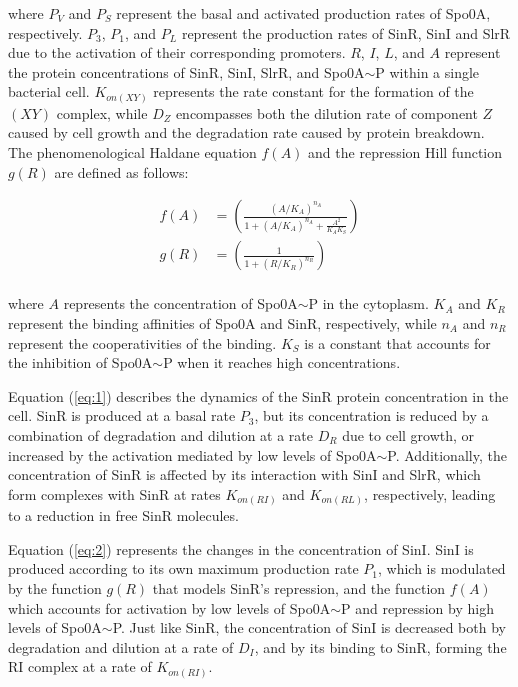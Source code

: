 where  \(P_V\) and \(P_S\) represent the basal and activated production rates of Spo0A, respectively.
\(P_3\), \(P_1\), and \(P_L\) represent the 
 production rates of SinR, SinI and SlrR due to the activation of their corresponding promoters.
 \(R\), \(I\), \(L\), and \(A\) represent the protein concentrations of SinR, SinI, SlrR, and Spo0A$\sim$P within a single
  bacterial cell. \(K_{on(XY)}\) represents the rate constant for the formation of the $(XY)$ complex,
   while \(D_Z\) encompasses both the dilution rate of component $Z$ caused by cell
    growth and the degradation rate caused by protein breakdown. The phenomenological 
    Haldane equation \(f(A)\) and the repression Hill function \(g(R)\) are defined as follows:


\begin{align*}
    f(A) &= \left(\frac{(A/K_A)^{n_A}}{1 + (A/K_A)^{n_A}+ \frac{A^2}{K_A K_S }} \right) \\ 
    g(R) &= \left(\frac{1}{1 + (R/K_R)^{n_R}}\right) \\
\end{align*}  

where $A$ represents the concentration of Spo0A$\sim$P in the cytoplasm. \(K_{A}\) and \(K_R\) represent
 the binding affinities of Spo0A and SinR, respectively, while \(n_A\) and \(n_R\) represent 
 the cooperativities of the binding. \(K_S\) is a constant that accounts for the inhibition of Spo0A$\sim$P 
 when it reaches high concentrations.

Equation (\ref{eq:1}) describes the dynamics of the SinR protein concentration in the cell. SinR is 
produced at a basal rate $P_3$, but its concentration is reduced by a combination of degradation and dilution 
at a rate $D_R$ due to cell growth, or 
increased by the activation mediated by low levels of Spo0A$\sim$P.
Additionally, the concentration of SinR is affected by its interaction with SinI and SlrR, which form complexes with SinR at rates $K_{on(RI)}$ and $K_{on(RL)}$, respectively, leading to a reduction in free SinR molecules.

Equation (\ref{eq:2}) represents the changes in the concentration of SinI. SinI is produced according to its own maximum production rate $P_1$, which is modulated by the function $g(R)$ that models SinR's repression, and the
 function $f(A)$ which accounts for activation by low levels of Spo0A$\sim$P and repression by high 
 levels of Spo0A$\sim$P. Just like SinR, the concentration of SinI is decreased both by degradation and dilution at a rate of $D_I$, and by its binding to SinR, forming the RI complex at a rate of $K_{on(RI)}$.

